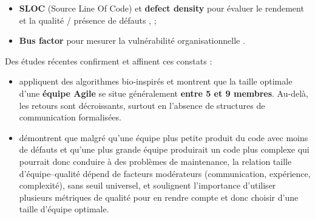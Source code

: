 \begin{itemize}
  \item \textbf{SLOC} (Source Line Of Code) et \textbf{defect density} pour évaluer le rendement et la qualité / présence de défauts \parencite{wikiSLOC}, \parencite{wikiSoftwareMetrics};
  \item \textbf{Bus factor} pour mesurer la vulnérabilité organisationnelle \parencite{wikiBusFactor}.
\end{itemize}
Des études récentes confirment et affinent ces constats :
\begin{itemize}
  \item \textcite{olivares_intelligent_2024} appliquent des algorithmes bio-inspirés et montrent que la taille optimale d’une \textbf{équipe Agile} se situe généralement \textbf{entre 5 et 9 membres}. Au-delà, les retours sont décroissants, surtout en l’absence de structures de communication formalisées.
    \item \textcite{bodaragama_exploring_2023} démontrent que malgré qu'une équipe plus petite produit du code avec moins de défauts et qu'une plus grande équipe produirait un code plus complexe qui pourrait donc conduire à des problèmes de maintenance, la relation taille d’équipe–qualité dépend de facteurs modérateurs (communication, expérience, complexité), sans seuil universel, et soulignent l’importance d’utiliser plusieurs métriques de qualité pour en rendre compte et donc choisir d'une taille d'équipe optimale.
%
\end{itemize}


